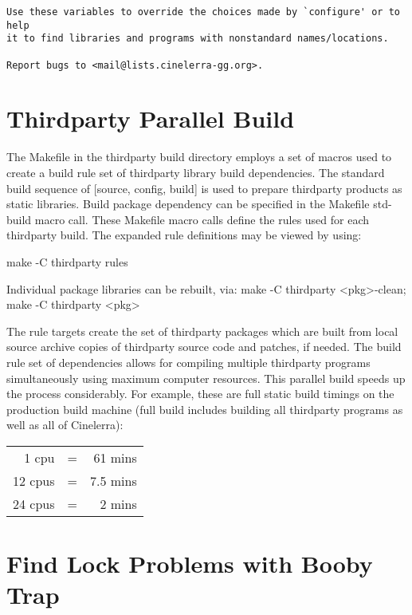 \begin{verbatim}
Use these variables to override the choices made by `configure' or to help
it to find libraries and programs with nonstandard names/locations.

Report bugs to <mail@lists.cinelerra-gg.org>.

\end{verbatim}
\endgroup

\section{Thirdparty Parallel Build}
\label{sec:Thirdparty Parallel Build}

The Makefile in the thirdparty build directory employs a set of macros used to create a build rule set of thirdparty library build dependencies.  The standard build sequence of [source, config, build] is used to prepare thirdparty products as static libraries.  Build package dependency can be specified in the Makefile std-build macro call.  These Makefile macro calls define the rules used for each thirdparty build.  The expanded rule definitions may be viewed by using:
\smallskip

\hspace{2em}make -C thirdparty rules
\medskip

Individual package libraries can be rebuilt, via:
\smallskip
\hspace{2em}make -C thirdparty <pkg>-clean;  make -C thirdparty <pkg>
\medskip

The rule targets create the set of thirdparty packages which are built from local source archive copies of thirdparty source code and patches, if needed.  The build rule set of dependencies allows for compiling multiple thirdparty programs simultaneously using maximum computer resources.  This parallel build speeds up the process considerably.  For example, these are full static build timings on the production build machine (full build includes building all thirdparty programs as well as all of Cinelerra):
\medskip

\hspace{2em}
\begin{tabular}{@{}rcr}
	1 cpu & = & 61 mins\\
	12 cpus & = & 7.5 mins\\
	24 cpus & = & 2 mins\\
\end{tabular}

\section{Find Lock Problems with Booby Trap}
\label{sec:Find Lock Problems with Booby Trap}

